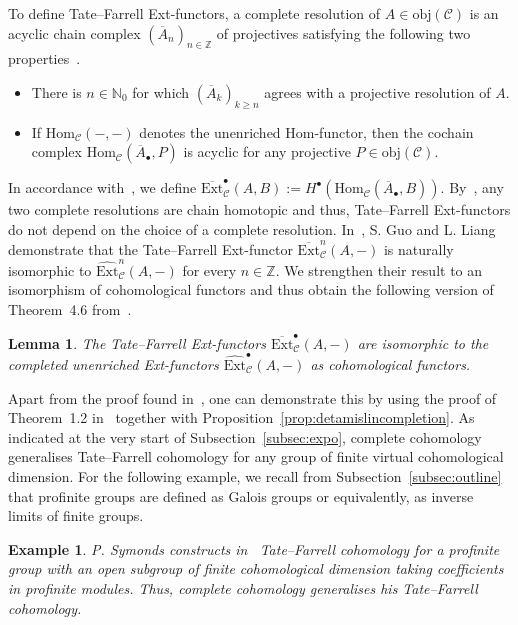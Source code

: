 \documentclass[12pt, a4paper]{article}
\numberwithin{equation}{section}
\newtheorem{lem}[thm]{Lemma}
\newtheorem{exl}[thm]{Example}
\theoremstyle{empty}
\theoremstyle{nonumberplain}
\begin{document}
To define Tate--Farrell Ext-functors, a complete resolution of $A \in \mathrm{obj}(\mathcal{C})$ is an acyclic chain complex $(\overline{A}_n)_{n \in \mathbb{Z}}$ of projectives satisfying the following two properties~\cite[Definition~1.1]{cor97}.
\begin{itemize}
\item There is $n \in \mathbb{N}_0$ for which $(\overline{A}_k)_{k \geq n}$ agrees with a projective resolution of $A$.
\item If $\mathrm{Hom}_{\mathcal{C}}(-, -)$ denotes the unenriched Hom-functor, then the cochain complex $\mathrm{Hom}_{\mathcal{C}}(\overline{A}_{\bullet}, P)$ is acyclic for any projective $P \in \mathrm{obj}(\mathcal{C})$.
\end{itemize}
In accordance with~\cite[p.~158]{far77}, we define $\overline{\mathrm{Ext}}_{\mathcal{C}}^{\bullet}(A, B) := H^{\bullet}(\mathrm{Hom}_{\mathcal{C}}(\overline{A}_{\bullet}, B))$. By~\cite[Lemma~2.4]{cor97}, any two complete resolutions are chain homotopic and thus, Tate--Farrell Ext-functors do not depend on the choice of a complete resolution. In~\cite[Proposition~4.15]{guo23}, S.\! Guo and L.\! Liang demonstrate that the Tate--Farrell Ext-functor $\overline{\mathrm{Ext}}_{\mathcal{C}}^n(A, -)$ is naturally isomorphic to $\widehat{\mathrm{Ext}}_{\mathcal{C}}^n(A, -)$ for every $n \in \mathbb{Z}$. We strengthen their result to an isomorphism of cohomological functors and thus obtain the following version of Theorem~4.6 from~\cite{hu21}.

\begin{lem}\label{lem:tatefarrell}
The Tate--Farrell Ext-functors $\overline{\mathrm{Ext}}_{\mathcal{C}}^{\bullet}(A, -)$ are isomorphic to the completed unenriched Ext-functors $\widehat{\mathrm{Ext}}_{\mathcal{C}}^{\bullet}(A, -)$ as cohomological functors.
\end{lem}

Apart from the proof found in~\cite{hu21}, one can demonstrate this by using the proof of Theorem~1.2 in~\cite{cor97} together with Proposition~\ref{prop:detamislincompletion}. As indicated at the very start of Subsection~\ref{subsec:expo}, complete cohomology generalises Tate--Farrell cohomology for any group of finite virtual cohomological dimension. For the following example, we recall from Subsection~\ref{subsec:outline} that profinite groups are defined as Galois groups or equivalently, as inverse limits of finite groups.

\begin{exl}\label{exl:tatefarrell}
P.\! Symonds constructs in~\cite[p.~34]{sym07} Tate--Farrell cohomology for a profinite group with an open subgroup of finite cohomological dimension taking coefficients in profinite modules. Thus, complete cohomology generalises his Tate--Farrell cohomology.
\end{exl}
\end{document}

